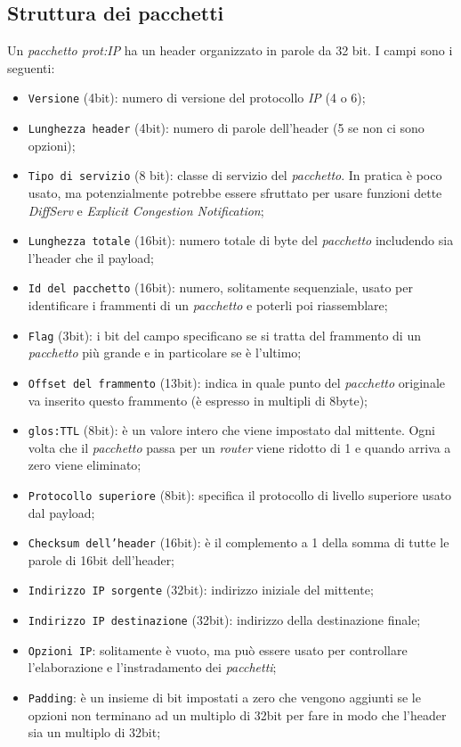 \subsection{Struttura dei pacchetti}
Un \emph{pacchetto \gls{prot:IP}} ha un header organizzato in parole da 32 bit.
I campi sono i seguenti:
\begin{itemize}
    \item \texttt{Versione} (4bit): numero di versione del protocollo \emph{IP} (4 o 6);
    \item \texttt{Lunghezza header} (4bit): numero di parole dell'header (5 se
    non ci sono opzioni);
    \item \texttt{Tipo di servizio} (8 bit): classe di servizio del \emph{pacchetto}.
    In pratica è poco usato, ma potenzialmente potrebbe essere sfruttato per usare
    funzioni dette \emph{DiffServ} e \emph{Explicit Congestion Notification};
    \item \texttt{Lunghezza totale} (16bit): numero totale di byte del
    \emph{pacchetto} includendo sia l'header che il payload;
    \item \texttt{Id del pacchetto} (16bit): numero, solitamente sequenziale,
    usato per identificare i frammenti di un \emph{pacchetto} e poterli poi
    riassemblare;
    \item \texttt{Flag} (3bit): i bit del campo specificano se si tratta del
    frammento di un \emph{pacchetto} più grande e in particolare se è l'ultimo;
    \item \texttt{Offset del frammento} (13bit): indica in quale punto del
    \emph{pacchetto} originale va inserito questo frammento (è espresso in
    multipli di 8byte);
    \item \texttt{\gls{glos:TTL}} (8bit): è un valore intero che viene impostato dal
    mittente. Ogni volta che il \emph{pacchetto} passa per un \emph{router} viene
    ridotto di 1 e quando arriva a zero viene eliminato;
    \item \texttt{Protocollo superiore} (8bit): specifica il protocollo di livello
    superiore usato dal payload;
    \item \texttt{Checksum dell'header} (16bit): è il complemento a 1 della somma
    di tutte le parole di 16bit dell'header;
    \item \texttt{Indirizzo IP sorgente} (32bit): indirizzo iniziale del mittente;
    \item \texttt{Indirizzo IP destinazione} (32bit): indirizzo della destinazione
    finale;
    \item \texttt{Opzioni IP}: solitamente è vuoto, ma può essere usato per
    controllare l'elaborazione e l'instradamento dei \emph{pacchetti};
    \item \texttt{Padding}: è un insieme di bit impostati a zero che vengono
    aggiunti se le opzioni non terminano ad un multiplo di 32bit per fare in
    modo che l'header sia un multiplo di 32bit;
\end{itemize}

